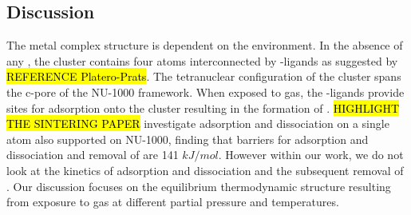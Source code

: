 \documentclass[journal=jctcce,manuscript=article]{achemso}
\begin{document}

\newpage
\subsection{Discussion}
The  metal complex structure is dependent on the environment. In the absence of any , the cluster contains four  atoms interconnected by -ligands as suggested by \hl{REFERENCE Platero-Prats}. The tetranuclear configuration of the  cluster spans the c-pore of the NU-1000 framework. When exposed to  gas, the -ligands provide sites for  adsorption onto the cluster resulting in the formation of .  \hl{HIGHLIGHT THE SINTERING PAPER} investigate  adsorption and dissociation on a single  atom also supported on NU-1000, finding that barriers for  adsorption and dissociation and removal of  are 141 $kJ/mol$. However within our work, we do not look at the kinetics of  adsorption and dissociation and the subsequent removal of . Our discussion focuses on the equilibrium thermodynamic structure resulting from exposure to  gas at different partial pressure and temperatures. 
\end{document}
